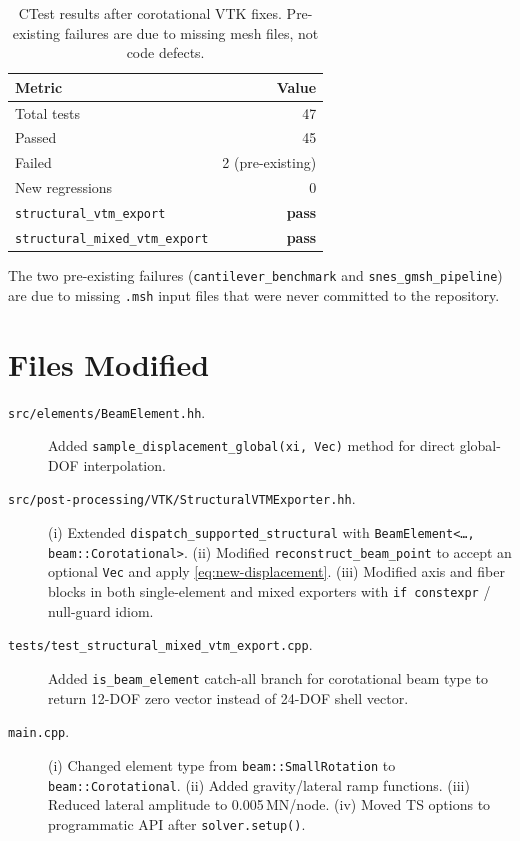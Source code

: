 \begin{table}[htbp]
\centering
\caption{CTest results after corotational VTK fixes.
  Pre-existing failures are due to missing mesh files, not code defects.}
\label{tab:corot-test-results}
\begin{tabular}{lr}
\toprule
  \textbf{Metric} & \textbf{Value} \\
\midrule
  Total tests         & 47 \\
  Passed              & 45 \\
  Failed              & 2 (pre-existing) \\
  New regressions     & 0 \\
\midrule
  \texttt{structural\_vtm\_export}       & \textbf{pass} \\
  \texttt{structural\_mixed\_vtm\_export} & \textbf{pass} \\
\bottomrule
\end{tabular}
\end{table}

The two pre-existing failures (\texttt{cantilever\_benchmark} and
\texttt{snes\_gmsh\_pipeline}) are due to missing \texttt{.msh} input
files that were never committed to the repository.

\section{Files Modified}
\label{sec:corot-files-modified}

\begin{description}
  \item[\texttt{src/elements/BeamElement.hh}.]
    Added \texttt{sample\_displacement\_global(xi, Vec)} method
    for direct global-DOF interpolation.

  \item[\texttt{src/post-processing/VTK/StructuralVTMExporter.hh}.]
    (i) Extended \texttt{dispatch\_supported\_structural} with
    \texttt{BeamElement<\ldots, beam::Corotational>}.
    (ii) Modified \texttt{reconstruct\_beam\_point} to accept an
    optional \texttt{Vec} and apply \cref{eq:new-displacement}.
    (iii) Modified axis and fiber blocks in both single-element and
    mixed exporters with \texttt{if constexpr} / null-guard idiom.

  \item[\texttt{tests/test\_structural\_mixed\_vtm\_export.cpp}.]
    Added \texttt{is\_beam\_element} catch-all branch for corotational
    beam type to return 12-DOF zero vector instead of 24-DOF shell
    vector.

  \item[\texttt{main.cpp}.]
    (i) Changed element type from \texttt{beam::SmallRotation} to
    \texttt{beam::Corotational}.
    (ii) Added gravity/lateral ramp functions.
    (iii) Reduced lateral amplitude to 0.005\,MN/node.
    (iv) Moved TS options to programmatic API after
    \texttt{solver.setup()}.
\end{description}

